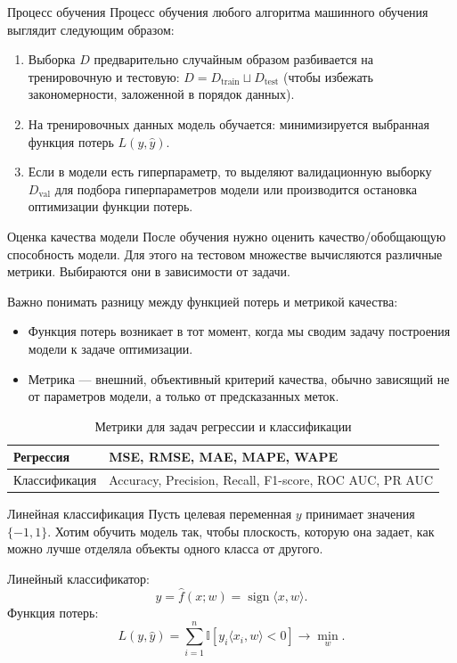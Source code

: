 \documentclass[notheorems, handout]{beamer}
\begin{document}
\begin{frame}{Процесс обучения}
	Процесс обучения любого алгоритма машинного обучения выглядит следующим образом:
	\begin{enumerate}
		\item Выборка $D$ предварительно случайным образом разбивается на тренировочную и тестовую: $D=D_\text{train} \sqcup D_\text{test}$ (чтобы избежать закономерности, заложенной в порядок данных).\medskip
		\item На тренировочных данных модель обучается: минимизируется выбранная функция потерь $L(y, \hat y)$.\medskip
		\item Если в модели есть гиперпараметр, то выделяют валидационную выборку $D_\text{val}$ для подбора гиперпараметров модели или производится остановка оптимизации функции потерь.
	\end{enumerate}
\end{frame}

\begin{frame}{Оценка качества модели}
	После обучения нужно оценить качество/обобщающую способность модели. Для этого на тестовом множестве вычисляются различные метрики. Выбираются они в зависимости от задачи.\smallskip

	Важно понимать разницу между функцией потерь и метрикой качества:
	\begin{itemize}
		\item Функция потерь возникает в тот момент, когда мы сводим задачу построения модели к задаче оптимизации.
		\item Метрика — внешний, объективный критерий качества, обычно зависящий не от параметров модели, а только от предсказанных меток.
	\end{itemize}
	\begin{table}[h!]
		\centering
		\caption{Метрики для задач регрессии и классификации}
		\begin{tabular}{|p{3cm}|p{6cm}|}
			\hline
			Регрессия & MSE, RMSE, MAE, MAPE, WAPE \\
			\hline
			Классификация & Accuracy, Precision, Recall, F1-score, ROC AUC, PR AUC \\
			\hline
		\end{tabular}
	\end{table}\medskip
\end{frame}

\begin{frame}{Линейная классификация}
	Пусть целевая переменная $y$ принимает значения $\{-1, 1\}$. Хотим обучить модель так, чтобы плоскость, которую она задает, как можно лучше отделяла объекты одного класса от другого.\medskip

	Линейный классификатор:
	\[
		\hat y = \hat f(x; w) = \operatorname{sign} \langle x, w\rangle.
	\]
	Функция потерь:
	\[
		L(y, \hat{y}) = \sum_{i=1}^{n}\mathbb{I}[y_i \langle x_i, w\rangle < 0] \longrightarrow \min_{w}.
	\]
\end{frame}
\end{document}
